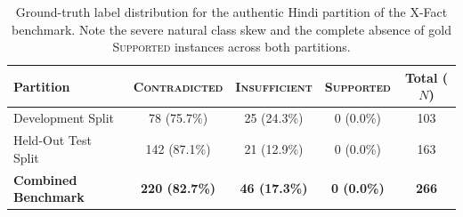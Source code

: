 \begin{table}[t]
\centering
\small
\caption{Ground-truth label distribution for the authentic Hindi partition of the X-Fact benchmark. Note the severe natural class skew and the complete absence of gold \textsc{Supported} instances across both partitions.}
\label{tab:dataset-distribution}
\begin{tabular}{lcccc}
\toprule
\textbf{Partition} & \textbf{\textsc{Contradicted}} & \textbf{\textsc{Insufficient}} & \textbf{\textsc{Supported}} & \textbf{Total ($N$)} \\
\midrule
Development Split & 78 (75.7\%) & 25 (24.3\%) & 0 (0.0\%) & 103 \\
Held-Out Test Split & 142 (87.1\%) & 21 (12.9\%) & 0 (0.0\%) & 163 \\
\midrule
\textbf{Combined Benchmark} & \textbf{220 (82.7\%)} & \textbf{46 (17.3\%)} & \textbf{0 (0.0\%)} & \textbf{266} \\
\bottomrule
\end{tabular}
\end{table}
